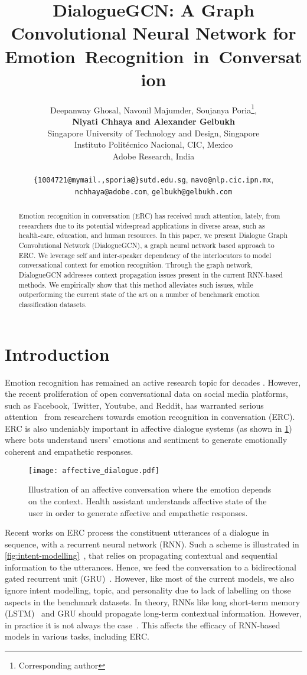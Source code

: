 \documentclass[11pt,a4paper]{article}
\title{DialogueGCN: A Graph Convolutional Neural Network for Emotion~Recognition~in~Conversation}
\author{Deepanway Ghosal, Navonil Majumder, Soujanya Poria\thanks{ Corresponding author},\\ \textbf{Niyati Chhaya and Alexander Gelbukh}\\
  Singapore University of Technology and Design, Singapore \\
 Instituto Polit\'ecnico Nacional, CIC, Mexico \\
  Adobe Research, India\\
\\ {\tt \{1004721@mymail.,sporia@\}sutd.edu.sg}, {\tt navo@nlp.cic.ipn.mx},\\ {\tt nchhaya@adobe.com}, {\tt gelbukh@gelbukh.com} 
}
\date{}
\begin{document}
\maketitle

\begin{abstract}

Emotion recognition in conversation (ERC) has received much attention, lately, from researchers due to its potential widespread applications in diverse areas, such as health-care, education, and human resources. In this paper, we present Dialogue Graph Convolutional Network (DialogueGCN), a graph neural network based approach to ERC. We leverage self and inter-speaker dependency of the interlocutors to model conversational context for emotion recognition. Through the graph network, DialogueGCN addresses context propagation issues present in the current RNN-based methods. We empirically show that this method alleviates such issues, while outperforming the current state of the art on a number of benchmark emotion classification datasets.
\end{abstract}

\section{Introduction}

Emotion recognition has remained an active research topic for decades \cite{dmello,iemocap,strapparava2010annotating}. However, the recent proliferation of open conversational data on social media platforms, such as Facebook, Twitter, Youtube, and Reddit, has warranted serious attention~\cite{poria2019emotion,dialoguernn,huang2019ana} from researchers towards emotion recognition in conversation (ERC). ERC is also undeniably important in affective dialogue systems (as shown in \cref{fig:affective-dialogue}) where bots understand users' emotions and sentiment to generate emotionally coherent and empathetic responses. 

\begin{figure}[t]
    \centering
    \texttt{[image: affective\_dialogue.pdf]}
    \caption{Illustration of an affective conversation where the emotion depends on the context. Health assistant understands affective state of the user in order to generate affective and empathetic responses.}
    \label{fig:affective-dialogue}
\end{figure}

Recent works on ERC process the constituent utterances of a dialogue in sequence, with a recurrent neural network (RNN). Such a scheme is illustrated in \cref{fig:intent-modelling}~\cite{poria2019emotion}, that relies on propagating contextual and sequential information to the utterances. Hence, we feed the conversation to a bidirectional gated recurrent unit (GRU)~\cite{gru}. However, like most of the current models, we also ignore intent modelling, topic, and personality due to lack of labelling on those aspects in the benchmark datasets. In theory, RNNs like long short-term memory (LSTM)~\cite{hochreiter1997long} and GRU should propagate long-term contextual information. However, in practice it is not always the case~\cite{bradbury2016quasi}. This affects the efficacy of RNN-based models in various tasks, including ERC.
\end{document}
